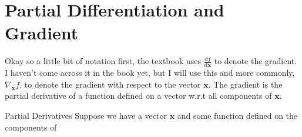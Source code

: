 \section{Partial Differentiation and Gradient}

Okay so a little bit of notation first, the textbook uses $\frac{\mathrm{d}f}{\mathrm{d}\bm{x}}$ to denote the gradient. I haven't come across it in the book yet, but I will use this and more commonly, $\nabla_{\bm{x}} f$, to denote the gradient with respect to the vector $\bm{x}$. The gradient is the partial derivative of a function defined on a vector w.r.t all components of $\bm{x}$.



\begin{example}{Partial Derivatives}
    Suppose we have a vector $\bm{x}$ and some function defined on the components of 
\end{example}